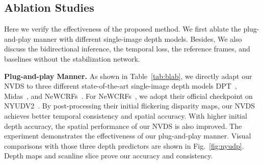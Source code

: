 \documentclass[10pt,twocolumn,letterpaper]{article}
\def\sx{NVDS}
\def\data{VDW}
\def\sota{state-of-the-art}
\def\reffig{Fig.}
\def\reftab{Table}
\begin{document}
\subsection{Ablation Studies}
\label{sec:abl}
Here we verify the effectiveness of the proposed method. We first ablate the plug-and-play manner with different single-image depth models. Besides, We also discuss the bidirectional inference, the temporal loss, the reference frames, and baselines without the stabilization network. 






\noindent \textbf{Plug-and-play Manner.} As shown in \reftab{}~\ref{tab:blab}, we directly adapt our \sx{} to three different \sota{} single-image depth models DPT~\cite{dpt}, Midas~\cite{midas}, and NeWCRFs~\cite{newcrfs}. For NeWCRFs~\cite{newcrfs}, we adopt their official checkpoint on NYUDV2~\cite{nyu}. By post-processing their initial flickering disparity maps, our \sx{} achieves better temporal consistency and spatial accuracy. With higher initial depth accuracy, the spatial performance of our \sx{} is also improved. The experiment demonstrates the effectiveness of our plug-and-play manner. Visual comparisons with those three depth predictors are shown in \reffig{}~\ref{fig:nyudp}. Depth maps and scanline slice prove our accuracy and consistency.


\begin{table}[!t]
    \centering
{}
    \vspace{-6pt}
    \caption{\textbf{Temporal loss and inter-frame intervals} . We randomly split  videos for training and  videos for testing from our \data{} dataset in these two experiments.}
    \label{tab:clipop}
\end{table}
\end{document}
